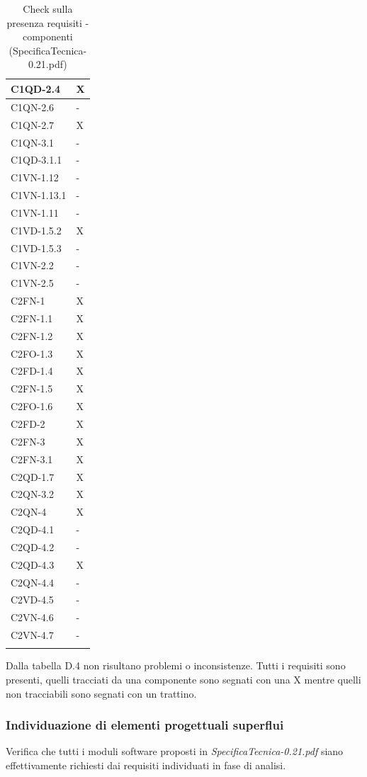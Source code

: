 \begin{footnotesize}
\begin{longtable}{|p{}|p{}|}
 C1QD-2.4&X  \\ \hline
 C1QN-2.6&-  \\ \hline
 C1QN-2.7&X    \\ \hline
 C1QN-3.1&-   \\ \hline
 C1QD-3.1.1&-    \\ \hline
 C1VN-1.12&- \\ \hline
 C1VN-1.13.1&-  \\ \hline
 C1VN-1.11&-  \\ \hline
 C1VD-1.5.2&X \\ \hline
 C1VD-1.5.3&-   \\ \hline
 C1VN-2.2&- \\ \hline
 C1VN-2.5&-  \\ \hline
 C2FN-1&X    \\ \hline
 C2FN-1.1&X    \\ \hline
 C2FN-1.2&X   \\ \hline
 C2FO-1.3&X    \\ \hline
 C2FD-1.4&X   \\ \hline
 C2FN-1.5&X   \\ \hline
 C2FO-1.6&X   \\ \hline
 C2FD-2&X    \\ \hline
 C2FN-3&X   \\ \hline
 C2FN-3.1&X   \\ \hline
 C2QD-1.7&X   \\ \hline
 C2QN-3.2&X   \\ \hline
 C2QN-4 &X  \\ \hline
 C2QD-4.1&-    \\ \hline
 C2QD-4.2&-   \\ \hline
 C2QD-4.3&X   \\ \hline
 C2QN-4.4&-  \\ \hline
 C2VD-4.5&-   \\ \hline
 C2VN-4.6&-    \\ \hline
 C2VN-4.7&-  \\ \hline

\caption{Check sulla presenza requisiti - componenti
(SpecificaTecnica-0.21.pdf)}
\end{longtable}
\end{footnotesize}

Dalla tabella D.4 non risultano problemi o inconsistenze. Tutti i requisiti sono
presenti, quelli tracciati da una componente sono segnati con una X mentre
quelli non tracciabili sono segnati con un trattino.

\subsubsection*{Individuazione di elementi progettuali superflui}
Verifica che tutti i moduli software proposti in
\emph{SpecificaTecnica-0.21.pdf} siano effettivamente richiesti dai requisiti
individuati in fase di analisi.

